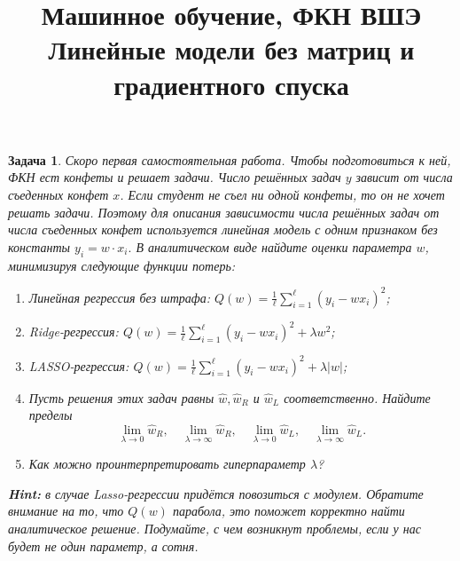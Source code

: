 \documentclass[12pt,fleqn]{article}
\title{Машинное обучение, ФКН ВШЭ \\  Линейные модели без матриц и градиентного спуска}
\author{}
\date{}
\newtheorem{esProblem}{Задача}
\begin{document}
\maketitle

\begin{esProblem}
Скоро первая самостоятельная работа. Чтобы подготовиться к ней, ФКН ест конфеты и решает задачи. Число решённых задач $y$ зависит от числа съеденных конфет $x$. Если студент не съел ни одной конфеты, то он не хочет решать задачи. Поэтому для описания зависимости числа решённых задач от числа съеденных конфет используется линейная модель с одним признаком без константы $y_i = w \cdot x_i.$ В аналитическом виде найдите оценки параметра $w$, минимизируя следующие функции потерь:

\begin{enumerate}
    \item Линейная регрессия без штрафа: $Q(w) = \frac{1}{\ell} \sum_{i=1}^{\ell} (y_i - w x_i)^2$;
    \item Ridge-регрессия: $Q(w) = \frac{1}{\ell} \sum_{i=1}^{\ell} (y_i - w x_i)^2 + \lambda w^2$;
    \item LASSO-регрессия: $Q(w) = \frac{1}{\ell} \sum_{i=1}^{\ell} (y_i - w x_i)^2 + \lambda |w|$;
    \item Пусть решения этих задач равны $\hat{w}, \hat{w}_R$ и $\hat{w}_L$ соответственно. Найдите пределы 
        \begin{equation*} 
            \lim_{\lambda \to 0}  \hat{w}_R, \quad \lim_{\lambda \to \infty}  \hat{w}_R, \quad \lim_{\lambda \to 0}  \hat{w}_L, \quad \lim_{\lambda \to \infty}  \hat{w}_L.
        \end{equation*} 
    \item Как можно проинтерпретировать гиперпараметр $\lambda$? 
\end{enumerate}

\textbf{Hint:} в случае Lasso-регрессии придётся повозиться с модулем. Обратите внимание на то, что $Q(w)$ парабола, это поможет корректно найти аналитическое решение. Подумайте, с чем возникнут проблемы, если у нас будет не один параметр, а сотня. 
\end{esProblem}
\end{document}
